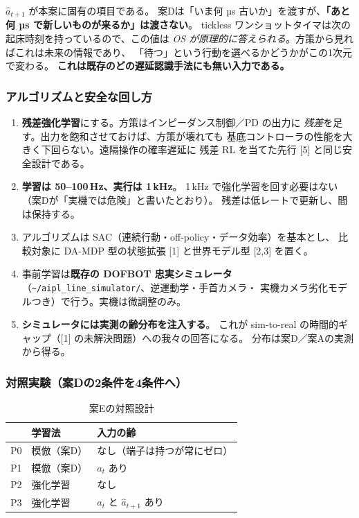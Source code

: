 \documentclass[11pt,a4paper]{article}
\newcommand{\code}[1]{\texttt{#1}}
\newcommand{\prob}[1]{\textbf{\textcolor{red!55!black}{#1}}}
\newcommand{\keyp}[1]{\textbf{\textcolor{blue!45!black}{#1}}}
\begin{document}
\medskip
\noindent
$\hat a_{t+1}$ が本案に固有の項目である。
案Dは「いま何 µs 古いか」を渡すが、\keyp{「あと何 µs で新しいものが来るか」は渡さない}。
tickless ワンショットタイマは次の起床時刻を持っているので、この値は
\emph{OS が原理的に答えられる}。方策から見ればこれは未来の情報であり、
「待つ」という行動を選べるかどうかがこの1次元で変わる。
\prob{これは既存のどの遅延認識手法にも無い入力である。}

\subsubsection*{アルゴリズムと安全な回し方}

\begin{enumerate}[leftmargin=1.6em,itemsep=3pt]
  \item \keyp{残差強化学習}にする。方策はインピーダンス制御／PD の出力に
        \emph{残差}を足す。出力を飽和させておけば、方策が壊れても
        基底コントローラの性能を大きく下回らない。遠隔操作の確率遅延に
        残差 RL を当てた先行 [5] と同じ安全設計である。
  \item \keyp{学習は 50--100\,Hz、実行は 1\,kHz}。
        1\,kHz で強化学習を回す必要はない（案Dが「実機では危険」と書いたとおり）。
        残差は低レートで更新し、間は保持する。
  \item アルゴリズムは SAC（連続行動・off-policy・データ効率）を基本とし、
        比較対象に DA-MDP 型の状態拡張 [1] と世界モデル型 [2,3] を置く。
  \item 事前学習は\keyp{既存の DOFBOT 忠実シミュレータ}
        （\code{\textasciitilde/aipl\_line\_simulator/}、逆運動学・手首カメラ・
        実機カメラ劣化モデルつき）で行う。実機は微調整のみ。
  \item \keyp{シミュレータには実測の齢分布を注入する}。
        これが sim-to-real の時間的ギャップ（[1] の未解決問題）への我々の回答になる。
        分布は案D／案Aの実測から得る。
\end{enumerate}

\subsubsection*{対照実験（案Dの2条件を4条件へ）}

\begin{table}[htbp]
\centering
\small
\caption{案Eの対照設計}
\begin{tabularx}{\textwidth}{@{}l l X@{}}
\toprule
 & \textbf{学習法} & \textbf{入力の齢} \\
\midrule
P0 & 模倣（案D） & なし（端子は持つが常にゼロ） \\
P1 & 模倣（案D） & $a_t$ あり \\
P2 & 強化学習 & なし \\
P3 & 強化学習 & $a_t$ と $\hat a_{t+1}$ あり \\
\bottomrule
\end{tabularx}
\end{table}
\end{document}
